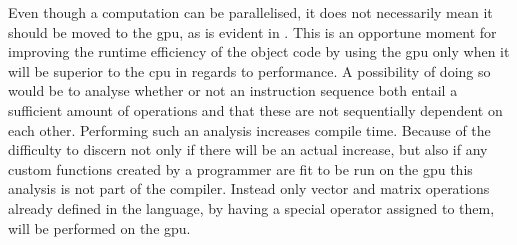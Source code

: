 Even though a computation can be parallelised, it does not necessarily mean it should be moved to the \acrshort{gpu}, as is evident in .
This is an opportune moment for improving the runtime efficiency of the object code by using the \acrshort{gpu} only when it will be superior to the \acrshort{cpu} in regards to performance.
A possibility of doing so would be to analyse whether or not an instruction sequence both entail a sufficient amount of operations and that these are not sequentially dependent on each other.
Performing such an analysis increases compile time.
Because of the difficulty to discern not only if there will be an actual increase, but also if any custom functions created by a programmer are fit to be run on the \acrshort{gpu} this analysis is not part of the compiler.
Instead only vector and matrix operations already defined in the language, by having a special operator assigned to them, will be performed on the \acrshort{gpu}.

